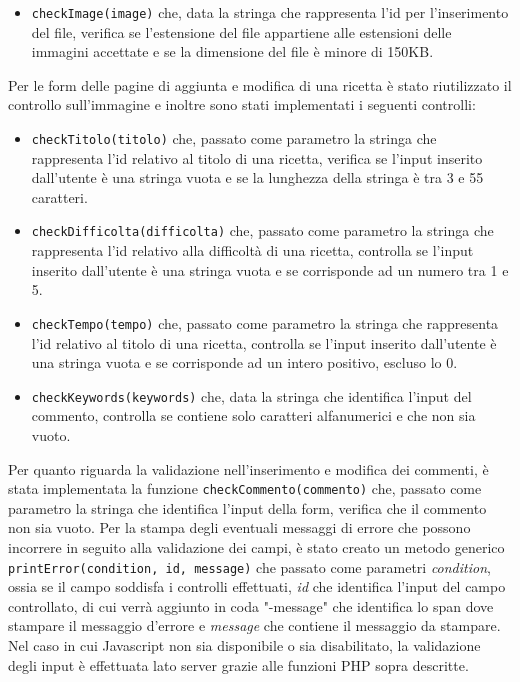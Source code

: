 \begin{itemize}
	\item \texttt{checkImage(image)} che, data la stringa che rappresenta l'id per l'inserimento del file, verifica se l'estensione del file appartiene alle estensioni delle immagini accettate e se la dimensione del file è minore di 150KB.
\end{itemize}
Per le form delle pagine di aggiunta e modifica di una ricetta è stato riutilizzato il controllo sull'immagine e inoltre sono stati implementati i seguenti controlli:
\begin{itemize}
	\item \texttt{checkTitolo(titolo)} che, passato come parametro la stringa che rappresenta l'id relativo al titolo di una ricetta, verifica se l'input inserito dall'utente è una stringa vuota e se la lunghezza della stringa è tra 3 e 55 caratteri.
	\item \texttt{checkDifficolta(difficolta)} che, passato come parametro la stringa che rappresenta l'id relativo alla difficoltà di una ricetta, controlla se l'input inserito dall'utente è una stringa vuota e se corrisponde ad un numero tra 1 e 5.
	\item \texttt{checkTempo(tempo)} che, passato come parametro la stringa che rappresenta l'id relativo al titolo di una ricetta, controlla se l'input inserito dall'utente è una stringa vuota e se corrisponde ad un intero positivo, escluso lo 0.
	\item \texttt{checkKeywords(keywords)} che, data la stringa che identifica l'input del commento, controlla se contiene solo caratteri alfanumerici e che non sia vuoto.
\end{itemize}
Per quanto riguarda la validazione nell'inserimento e modifica dei commenti, è stata implementata la funzione \texttt{checkCommento(commento)} che, passato come parametro la stringa che identifica l'input della form, verifica che il commento non sia vuoto. \newline
Per la stampa degli eventuali messaggi di errore che possono incorrere in seguito alla validazione dei campi, è stato creato un metodo generico \texttt{printError(condition, id, message)} che passato come parametri \textit{condition}, ossia se il campo soddisfa i controlli effettuati, \textit{id} che identifica l'input del campo controllato, di cui verrà aggiunto in coda "-message" che identifica lo span dove stampare il messaggio d'errore e \textit{message} che contiene il messaggio da stampare.
Nel caso in cui Javascript non sia disponibile o sia disabilitato, la validazione degli input è effettuata lato server grazie alle funzioni PHP sopra descritte.

